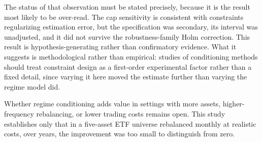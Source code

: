 \documentclass[11pt,letterpaper]{article}
\begin{document}
The status of that observation must be stated precisely, because it is
the result most likely to be over-read. The cap sensitivity is
consistent with constraints regularizing estimation error, but the
specification was secondary, its interval was unadjusted, and it did not
survive the robustness-family Holm correction. This result is
hypothesis-generating rather than confirmatory evidence. What it
suggests is methodological rather
than empirical: studies of conditioning methods should treat constraint
design as a first-order experimental factor rather than a fixed detail,
since varying it here moved the estimate further than varying the regime
model did.

Whether regime conditioning adds value in settings with more assets,
higher-frequency rebalancing, or lower trading costs remains open. This
study establishes only that in a five-asset ETF universe rebalanced
monthly at realistic costs, over \oosYears{} years, the improvement was
too small to distinguish from zero.


\end{document}
